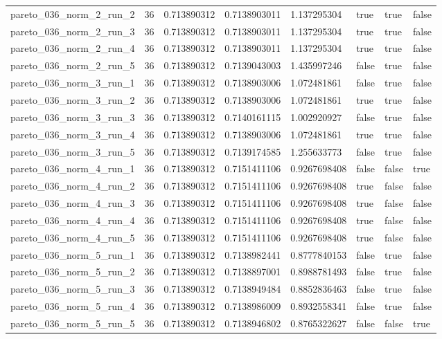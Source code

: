 \begin{tabular}{@{}llllllll@{}}
pareto\_036\_norm\_2\_run\_2 & 36 & 0.713890312 & 0.7138903011 & 1.137295304 & true & true & false \\
pareto\_036\_norm\_2\_run\_3 & 36 & 0.713890312 & 0.7138903011 & 1.137295304 & true & true & false \\
pareto\_036\_norm\_2\_run\_4 & 36 & 0.713890312 & 0.7138903011 & 1.137295304 & true & true & false \\
pareto\_036\_norm\_2\_run\_5 & 36 & 0.713890312 & 0.7139043003 & 1.435997246 & false & true & false \\
pareto\_036\_norm\_3\_run\_1 & 36 & 0.713890312 & 0.7138903006 & 1.072481861 & false & true & false \\
pareto\_036\_norm\_3\_run\_2 & 36 & 0.713890312 & 0.7138903006 & 1.072481861 & true & true & false \\
pareto\_036\_norm\_3\_run\_3 & 36 & 0.713890312 & 0.7140161115 & 1.002920927 & false & true & false \\
pareto\_036\_norm\_3\_run\_4 & 36 & 0.713890312 & 0.7138903006 & 1.072481861 & true & true & false \\
pareto\_036\_norm\_3\_run\_5 & 36 & 0.713890312 & 0.7139174585 & 1.255633773 & false & true & false \\
pareto\_036\_norm\_4\_run\_1 & 36 & 0.713890312 & 0.7151411106 & 0.9267698408 & false & false & true \\
pareto\_036\_norm\_4\_run\_2 & 36 & 0.713890312 & 0.7151411106 & 0.9267698408 & true & false & false \\
pareto\_036\_norm\_4\_run\_3 & 36 & 0.713890312 & 0.7151411106 & 0.9267698408 & true & false & false \\
pareto\_036\_norm\_4\_run\_4 & 36 & 0.713890312 & 0.7151411106 & 0.9267698408 & true & false & false \\
pareto\_036\_norm\_4\_run\_5 & 36 & 0.713890312 & 0.7151411106 & 0.9267698408 & true & false & false \\
pareto\_036\_norm\_5\_run\_1 & 36 & 0.713890312 & 0.7138982441 & 0.8777840153 & false & true & false \\
pareto\_036\_norm\_5\_run\_2 & 36 & 0.713890312 & 0.7138897001 & 0.8988781493 & false & true & false \\
pareto\_036\_norm\_5\_run\_3 & 36 & 0.713890312 & 0.7138949484 & 0.8852836463 & false & true & false \\
pareto\_036\_norm\_5\_run\_4 & 36 & 0.713890312 & 0.7138986009 & 0.8932558341 & false & true & false \\
pareto\_036\_norm\_5\_run\_5 & 36 & 0.713890312 & 0.7138946802 & 0.8765322627 & false & false & true \\

\end{tabular}
